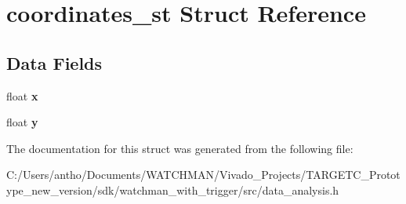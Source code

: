 \section{coordinates\+\_\+st Struct Reference}
\label{structcoordinates__st}
\subsection*{Data Fields}
\begin{DoxyCompactItemize}
\item 
\mbox{\label{structcoordinates__st_ad0da36b2558901e21e7a30f6c227a45e}} 
float {\bfseries x}
\item 
\mbox{\label{structcoordinates__st_aa4f0d3eebc3c443f9be81bf48561a217}} 
float {\bfseries y}
\end{DoxyCompactItemize}


The documentation for this struct was generated from the following file\+:\begin{DoxyCompactItemize}
\item 
C\+:/\+Users/antho/\+Documents/\+W\+A\+T\+C\+H\+M\+A\+N/\+Vivado\+\_\+\+Projects/\+T\+A\+R\+G\+E\+T\+C\+\_\+\+Prototype\+\_\+new\+\_\+version/sdk/watchman\+\_\+with\+\_\+trigger/src/data\+\_\+analysis.\+h\end{DoxyCompactItemize}
